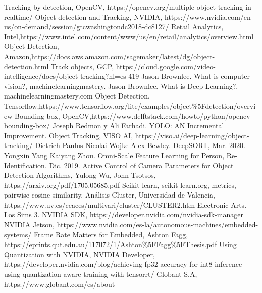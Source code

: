 \documentclass[conference]{IEEEtran}
\begin{document}
\begin{thebibliography}{00}
 Tracking by detection, OpenCV, https://opencv.org/multiple-object-tracking-in-realtime/
 Object detection and Tracking, NVIDIA, https://www.nvidia.com/en-us/on-demand/session/gtcwashingtondc2018-dc8127/
 Retail Analytics, Intel,\newline https://www.intel.com/content/www/us/en/retail/analytics/overview.html
 Object Detection, Amazon,\newline https://docs.aws.amazon.com/sagemaker/latest/dg/object-detection.html
 Track objects, GCP, https://cloud.google.com/video-intelligence/docs/object-tracking?hl=es-419
 Jason Brownlee. What is computer vision?, machinelearningmastery.
 Jason Brownlee. What is Deep Learning?, machinelearningmastery.com
 Object Detection, Tensorflow,\newline https://www.tensorflow.org/lite/examples/object\%5Fdetection/overview
 Bounding box, OpenCV,https://www.delftstack.com/howto/python/opencv-bounding-box/
 Joseph Redmon y Ali Farhadi. YOLO: AN Incremental Improvement.
 Object Tracking, VISO AI, https://viso.ai/deep-learning/object-tracking/
 Dietrich Paulus Nicolai Wojke Alex Bewley. DeepSORT, Mar. 2020.
 Yongxin Yang Kaiyang Zhou. Omni-Scale Feature Learning for Person, Re-Identification. Dic. 2019.
 Active Control of Camera Parameters for Object Detection Algorithms, Yulong Wu, John Tsotsos, https://arxiv.org/pdf/1705.05685.pdf
 Scikit learn, scikit-learn.org, metrics, pairwise cosine similarity.
 Análisis Cluster, Universidad de Valencia, https://www.uv.es/ceaces/multivari/cluster/CLUSTER2.htm
 Electronic Arts. Los Sims 3.
 NVIDIA SDK, https://developer.nvidia.com/nvidia-sdk-manager
 NVIDIA Jetson, https://www.nvidia.com/es-la/autonomous-machines/embedded-systems/
 Frame Rate Matters for Embedded, Ashton Fagg, https://eprints.qut.edu.au/117072/1/Ashton\%5FFagg\%5FThesis.pdf
 Using Quantization with NVIDIA, NVIDIA Developer, https://developer.nvidia.com/blog/achieving-fp32-accuracy-for-int8-inference-using-quantization-aware-training-with-tensorrt/
 Globant S.A, https://www.globant.com/es/about
\end{thebibliography}
\end{document}
